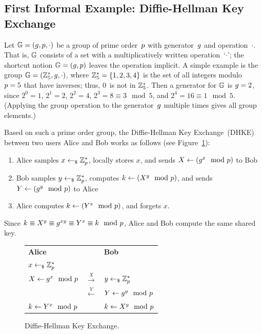 \subsection{First Informal Example: Diffie-Hellman Key Exchange}
\label{sec:overview:dhke}

Let $\mathbb{G}=(g,p,\cdot)$ be a group of prime order~$p$ with generator~$g$ and operation~$\cdot$.
That is, $\mathbb{G}$ consists of a set with a multiplicatively written operation~`$\cdot$';
the shortcut notion $\mathbb{G}=(g,p)$ leaves the operation implicit.
A simple example is the group $\mathbb{G}=(\mathbb{Z}_5^*,g,\cdot)$, where $\mathbb{Z}_5^* =
\{1,2,3,4\}$ is the set of all integers modulo~$p=5$ that have inverses; thus, $0$~is not in $\mathbb{Z}_5^*$.
Then a generator for $\mathbb{G}$ is $g=2$, since $2^0=1$, $2^1=2$,
$2^2=4$, $2^3=8\equiv3\mod 5$, and $2^4=16\equiv 1\mod 5$.
(Applying the group operation to the generator~$g$ multiple times gives all group elements.)

Based on such a prime order group, the Diffie-Hellman Key Exchange~(DHKE)~\cite{DifHel76}
between two users Alice and Bob works as follows (see Figure~\ref{fig:dhke}):
\begin{enumerate}
    \item Alice samples $x\gets_\$\mathbb{Z}_p^*$, locally stores $x$, and sends $X\gets(g^x\mod{p})$ to Bob
    \item Bob samples $y\gets_\$\mathbb{Z}_p^*$, computes $k\gets(X^y\mod{p})$, and sends $Y\gets(g^y\mod{p})$ to Alice
    \item Alice computes $k\gets(Y^x\mod{p})$, and forgets $x$.
\end{enumerate}
Since $k\equiv X^y\equiv g^{xy}\equiv Y^x\equiv k\mod {p}$, Alice and Bob compute the same shared key.

\begin{figure}
    \centering
    \begin{tabular}{lC{3cm}l}
        \textbf{Alice} & & \textbf{Bob}\\
        $x\gets_\$\mathbb{Z}_p^*$ & &\\
        $X\gets g^x\mod{p}$ & $\xrightarrow{X}$ & $y\gets_\$\mathbb{Z}_p^*$\\
        & $\xleftarrow{Y}$ & $Y\gets g^y\mod{p}$\\
        $k\gets Y^x\mod{p}$ & & $k\gets X^y\mod{p}$\\
    \end{tabular}
    \caption{Diffie-Hellman Key Exchange.}
    \label{fig:dhke}
\end{figure}

